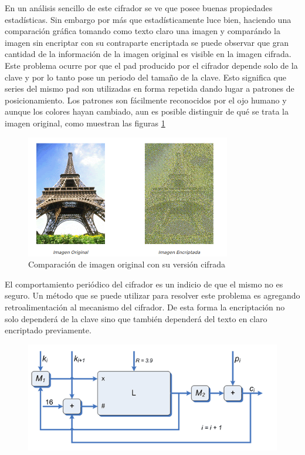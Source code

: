 \begin{example}
En un análisis sencillo de este cifrador se ve que posee buenas propiedades estadísticas. Sin embargo por más que estadísticamente luce bien, haciendo una comparación gráfica tomando como texto claro una imagen y comparándo la imagen sin encriptar con su contraparte encriptada se puede observar que gran cantidad de la información de la imagen original es visible en la imagen cifrada. Este problema ocurre por que el pad producido por el cifrador depende solo de la clave y por lo tanto pose un periodo del tamaño de la clave. Esto significa que series del mismo pad son utilizadas en forma repetida dando lugar a patrones de posicionamiento. Los patrones son fácilmente reconocidos por el ojo humano y aunque los colores hayan cambiado, aun es posible distinguir de qué se trata la imagen original, como muestran las figuras \ref{fig:ImagenCifrada}

\begin{figure}[hbpt]
\centering
\includegraphics[width = 0.8\textwidth]{img/imagenCifrada.png}
\caption{Comparación de imagen original con su versión cifrada}
\label{fig:ImagenCifrada}
\end{figure}

El comportamiento periódico del cifrador es un indicio de que el mismo no es seguro. Un método que se puede utilizar para resolver este problema es agregando retroalimentación al mecanismo del cifrador. De esta forma la encriptación no solo dependerá de la clave sino que también dependerá del texto en claro encriptado previamente.

\begin{figure}[H]
\centering
\includegraphics[width = \textwidth]{img/cifradoCaoticoRetro.png}
\end{figure}


\end{example}
